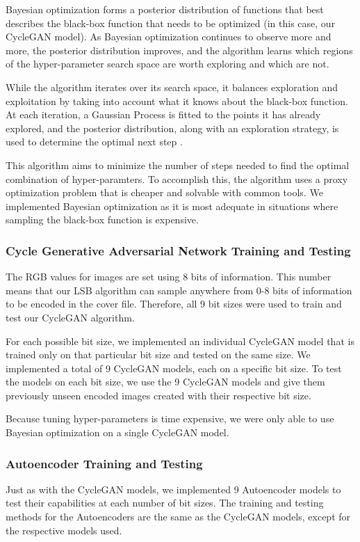 \documentclass[conference]{IEEEtran}
\begin{document}
Bayesian optimization forms a posterior distribution of functions that best describes the black-box function that needs to be optimized (in this case, our CycleGAN model). As Bayesian optimization continues to observe more and more, the posterior distribution improves, and the algorithm learns which regions of the hyper-parameter search space are worth exploring and which are not.

While the algorithm iterates over its search space, it balances exploration and exploitation by taking into account what it knows about the black-box function. At each iteration, a Gaussian Process \cite{rasmussen_gaussian_2006} is fitted to the points it has already explored, and the posterior distribution, along with an exploration strategy, is used to determine the optimal next step \cite{bayes_opt, brochu_tutorial_2010, snoek_practical_2012}. 

This algorithm aims to minimize the number of steps needed to find the optimal combination of hyper-paramters. To accomplish this, the algorithm uses a proxy optimization problem that is cheaper and solvable with common tools. We implemented Bayesian optimization as it is most adequate in situations where sampling the black-box function is expensive. 

\subsubsection{Cycle Generative Adversarial Network Training and Testing}
The RGB values for images are set using 8 bits of information. This number means that our LSB algorithm can sample anywhere from 0-8 bits of information to be encoded in the cover file. Therefore, all 9 bit sizes were used to train and test our CycleGAN algorithm.

For each possible bit size, we implemented an individual CycleGAN model that is trained only on that particular bit size and tested on the same size. We implemented a total of 9 CycleGAN models, each on a specific bit size. To test the models on each bit size, we use the 9 CycleGAN models and give them previously unseen encoded images created with their respective bit size.

Because tuning hyper-parameters is time expensive, we were only able to use Bayesian optimization on a single CycleGAN model.
    
\subsubsection{Autoencoder Training and Testing}
Just as with the CycleGAN models, we implemented 9 Autoencoder models to test their capabilities at each number of bit sizes. The training and testing methods for the Autoencoders are the same as the CycleGAN models, except for the respective models used.
\end{document}
